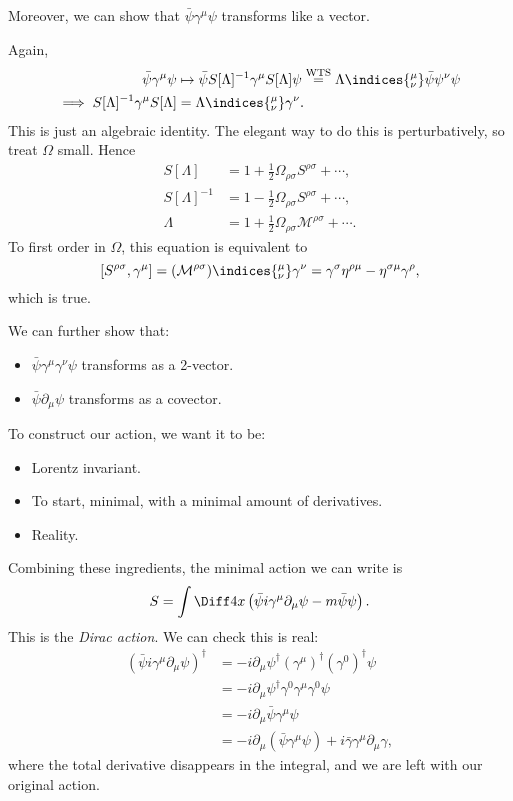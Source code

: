 \documentclass[12pt]{article}
\begin{document}
Moreover, we can show that $\bar \psi \gamma^\mu \psi$ transforms like a vector.

\begin{proofbox}
	Again,
	\begin{align*}
		\bar \psi \gamma^\mu \psi &\mapsto \bar \psi S[\Lambda]^{-1} \gamma^\mu S[\Lambda] \psi \overset{\mathrm{WTS}}= \Lambda\indices{^{\mu}_{\nu}} \bar \psi \psi^{\nu} \psi \\
		\implies S[\Lambda]^{-1} \gamma^\mu S[\Lambda] &= \Lambda\indices{^{\mu}_{\nu}} \gamma^{\nu}.
	\end{align*}
	This is just an algebraic identity. The elegant way to do this is perturbatively, so treat $\Omega$ small. Hence
	\begin{align*}
		S[\Lambda] &= 1 + \frac 12 \Omega_{\rho\sigma} S^{\rho\sigma} + \cdots, \\
		S[\Lambda]^{-1} &= 1 - \frac 12 \Omega_{\rho\sigma} S^{\rho\sigma} + \cdots, \\
		\Lambda &= 1 + \frac 12 \Omega_{\rho\sigma} \mathcal{M}^{\rho\sigma} + \cdots.
	\end{align*}
	To first order in $\Omega$, this equation is equivalent to
	\[
		[S^{\rho\sigma}, \gamma^{\mu}] = (\mathcal{M}^{\rho\sigma})\indices{^{\mu}_{\nu}} \gamma^{\nu} = \gamma^\sigma \eta^{\rho\mu} - \eta^{\sigma\mu} \gamma^{\rho},
	\]
	which is true.
\end{proofbox}

We can further show that:
\begin{itemize}
	\item $\bar \psi \gamma^\mu \gamma^\nu \psi$ transforms as a 2-vector.
	\item $\bar \psi \partial_\mu \psi$ transforms as a covector.
\end{itemize}

To construct our action, we want it to be:
\begin{itemize}
	\item Lorentz invariant.
	\item To start, minimal, with a minimal amount of derivatives.
	\item Reality.
\end{itemize}
Combining these ingredients, the minimal action we can write is
\[
S = \int \Diff 4 x \left( \bar \psi i \gamma^\mu \partial_\mu \psi - m \bar \psi \psi \right).
\]
This is the \emph{Dirac action}. We can check this is real:
\begin{align*}
	(\bar \psi i \gamma^\mu \partial_\mu \psi)^{\dagger} &= -i \partial_\mu \psi^{\dagger} (\gamma^\mu)^{\dagger} (\gamma^0)^{\dagger} \psi \\
							     &= -i \partial_\mu \psi^{\dagger} \gamma^0 \gamma^\mu \gamma^0 \psi \\
							     &= -i \partial_\mu \bar \psi \gamma^\mu \psi \\
							     &= -i \partial_\mu (\bar \psi \gamma^\mu \psi) + i \bar \gamma \gamma^\mu \partial_\mu \gamma,
\end{align*}
where the total derivative disappears in the integral, and we are left with our original action.
\end{document}
